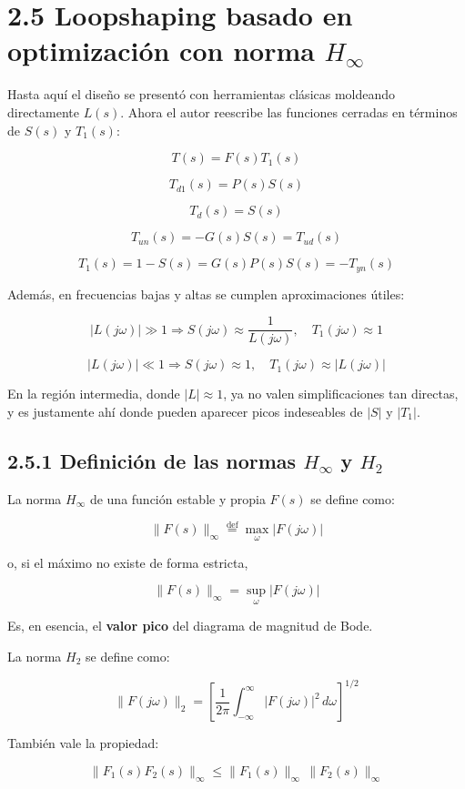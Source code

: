 \section{2.5 Loopshaping basado en optimización con norma \(H_\infty\)}
Hasta aquí el diseño se presentó con herramientas clásicas moldeando directamente \(L(s)\). Ahora el autor reescribe las funciones cerradas en términos de \(S(s)\) y \(T_1(s)\):

\[
T(s)=F(s)T_1(s) \tag{2.5.1}
\]

\[
T_{d1}(s)=P(s)S(s) \tag{2.5.2}
\]

\[
T_d(s)=S(s) \tag{2.5.3}
\]

\[
T_{un}(s)=-G(s)S(s)=T_{ud}(s) \tag{2.5.4}
\]

$$
T_1(s)=1-S(s)=G(s)P(s)S(s)=-T_{yn}(s)
$$

Además, en frecuencias bajas y altas se cumplen aproximaciones útiles:

$$
|L(j\omega)|\gg 1 \Rightarrow S(j\omega)\approx \frac{1}{L(j\omega)},\quad T_1(j\omega)\approx 1
$$

$$
|L(j\omega)|\ll 1 \Rightarrow S(j\omega)\approx 1,\quad T_1(j\omega)\approx |L(j\omega)|
$$

En la región intermedia, donde \(|L|\approx 1\), ya no valen simplificaciones tan directas, y es justamente ahí donde pueden aparecer picos indeseables de \(|S|\) y \(|T_1|\).

\subsection{2.5.1 Definición de las normas \(H_\infty\) y \(H_2\)}
La norma \(H_\infty\) de una función estable y propia \(F(s)\) se define como:

\[
\|F(s)\|_\infty \stackrel{\text{def}}{=} \max_\omega |F(j\omega)| \tag{2.5.6}
\]

o, si el máximo no existe de forma estricta,

\[
\|F(s)\|_\infty = \sup_\omega |F(j\omega)| \tag{2.5.6a}
\]

Es, en esencia, el \textbf{valor pico} del diagrama de magnitud de Bode.

La norma \(H_2\) se define como:

$$
\|F(j\omega)\|_2=
\left[
\frac{1}{2\pi}\int_{-\infty}^{\infty}|F(j\omega)|^2\,d\omega
\right]^{1/2}
$$

También vale la propiedad:

$$
\|F_1(s)F_2(s)\|_\infty \le \|F_1(s)\|_\infty \,\|F_2(s)\|_\infty
$$

